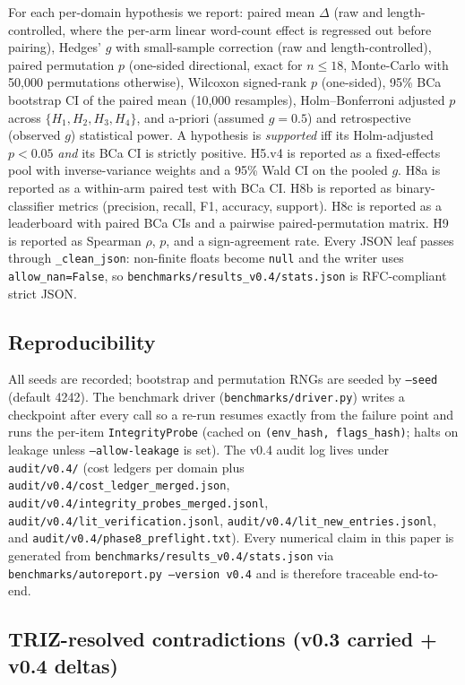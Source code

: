 For each per-domain hypothesis we report: paired mean $\Delta$ (raw and length-controlled, where the per-arm linear word-count effect is regressed out before pairing), Hedges' $g$ with small-sample correction (raw and length-controlled), paired permutation $p$ (one-sided directional, exact for $n \le 18$, Monte-Carlo with 50,000 permutations otherwise), Wilcoxon signed-rank $p$ (one-sided), 95\% BCa bootstrap CI of the paired mean (10,000 resamples), Holm--Bonferroni adjusted $p$ across $\{H_1, H_2, H_3, H_4\}$, and a-priori (assumed $g{=}0.5$) and retrospective (observed $g$) statistical power. A hypothesis is \emph{supported} iff its Holm-adjusted $p<0.05$ \emph{and} its BCa CI is strictly positive. H5.v4 is reported as a fixed-effects pool with inverse-variance weights and a 95\% Wald CI on the pooled $g$. H8a is reported as a within-arm paired test with BCa CI. H8b is reported as binary-classifier metrics (precision, recall, F1, accuracy, support). H8c is reported as a leaderboard with paired BCa CIs and a pairwise paired-permutation matrix. H9 is reported as Spearman $\rho$, $p$, and a sign-agreement rate. Every JSON leaf passes through \texttt{\_clean\_json}: non-finite floats become \texttt{null} and the writer uses \texttt{allow\_nan=False}, so \texttt{benchmarks/results\_v0.4/stats.json} is RFC-compliant strict JSON.

\subsection{Reproducibility}

All seeds are recorded; bootstrap and permutation RNGs are seeded by \texttt{--seed} (default 4242). The benchmark driver (\texttt{benchmarks/driver.py}) writes a checkpoint after every call so a re-run resumes exactly from the failure point and runs the per-item \texttt{IntegrityProbe} (cached on \texttt{(env\_hash, flags\_hash)}; halts on leakage unless \texttt{--allow-leakage} is set). The v0.4 audit log lives under \texttt{audit/v0.4/} (cost ledgers per domain plus \texttt{audit/v0.4/cost\_ledger\_merged.json}, \texttt{audit/v0.4/integrity\_probes\_merged.jsonl}, \texttt{audit/v0.4/lit\_verification.jsonl}, \texttt{audit/v0.4/lit\_new\_entries.jsonl}, and \texttt{audit/v0.4/phase8\_preflight.txt}). Every numerical claim in this paper is generated from \texttt{benchmarks/results\_v0.4/stats.json} via \texttt{benchmarks/autoreport.py --version v0.4} and is therefore traceable end-to-end.

\subsection{TRIZ-resolved contradictions (v0.3 carried + v0.4 deltas)}

